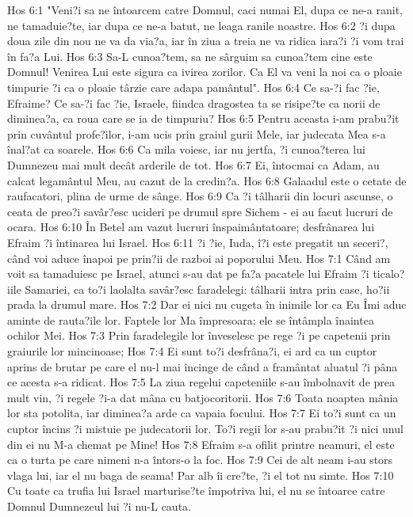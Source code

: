 Hos 6:1  "Veni?i sa ne întoarcem catre Domnul, caci numai El, dupa ce ne-a ranit, ne tamaduie?te, iar dupa ce ne-a batut, ne leaga ranile noastre.
Hos 6:2  ?i dupa doua zile din nou ne va da via?a, iar în ziua a treia ne va ridica iara?i ?i vom trai în fa?a Lui.
Hos 6:3  Sa-L cunoa?tem, sa ne sârguim sa cunoa?tem cine este Domnul! Venirea Lui este sigura ca ivirea zorilor. Ca El va veni la noi ca o ploaie timpurie ?i ca o ploaie târzie care adapa pamântul".
Hos 6:4  Ce sa-?i fac ?ie, Efraime? Ce sa-?i fac ?ie, Israele, fiindca dragostea ta se risipe?te ca norii de diminea?a, ca roua care se ia de timpuriu?
Hos 6:5  Pentru aceasta i-am prabu?it prin cuvântul profe?ilor, i-am ucis prin graiul gurii Mele, iar judecata Mea s-a înal?at ca soarele.
Hos 6:6  Ca mila voiesc, iar nu jertfa, ?i cunoa?terea lui Dumnezeu mai mult decât arderile de tot.
Hos 6:7  Ei, întocmai ca Adam, au calcat legamântul Meu, au cazut de la credin?a.
Hos 6:8  Galaadul este o cetate de raufacatori, plina de urme de sânge.
Hos 6:9  Ca ?i tâlharii din locuri ascunse, o ceata de preo?i savâr?esc ucideri pe drumul spre Sichem - ei au facut lucruri de ocara.
Hos 6:10  În Betel am vazut lucruri înspaimântatoare; desfrânarea lui Efraim ?i întinarea lui Israel.
Hos 6:11  ?i ?ie, Iuda, î?i este pregatit un seceri?, când voi aduce înapoi pe prin?ii de razboi ai poporului Meu.
Hos 7:1  Când am voit sa tamaduiesc pe Israel, atunci s-au dat pe fa?a pacatele lui Efraim ?i ticalo?iile Samariei, ca to?i laolalta savâr?esc faradelegi: tâlharii intra prin case, ho?ii prada la drumul mare.
Hos 7:2  Dar ei nici nu cugeta în inimile lor ca Eu Îmi aduc aminte de rauta?ile lor. Faptele lor Ma împresoara; ele se întâmpla înaintea ochilor Mei.
Hos 7:3  Prin faradelegile lor înveselesc pe rege ?i pe capetenii prin graiurile lor mincinoase;
Hos 7:4  Ei sunt to?i desfrâna?i, ei ard ca un cuptor aprins de brutar pe care el nu-l mai încinge de când a framântat aluatul ?i pâna ce acesta s-a ridicat.
Hos 7:5  La ziua regelui capeteniile s-au îmbolnavit de prea mult vin, ?i regele ?i-a dat mâna cu batjocoritorii.
Hos 7:6  Toata noaptea mânia lor sta potolita, iar diminea?a arde ca vapaia focului.
Hos 7:7  Ei to?i sunt ca un cuptor încins ?i mistuie pe judecatorii lor. To?i regii lor s-au prabu?it ?i nici unul din ei nu M-a chemat pe Mine!
Hos 7:8  Efraim s-a ofilit printre neamuri, el este ca o turta pe care nimeni n-a întors-o la foc.
Hos 7:9  Cei de alt neam i-au stors vlaga lui, iar el nu baga de seama! Par alb îi cre?te, ?i el tot nu simte.
Hos 7:10  Cu toate ca trufia lui Israel marturise?te împotriva lui, el nu se întoarce catre Domnul Dumnezeul lui ?i nu-L cauta.
